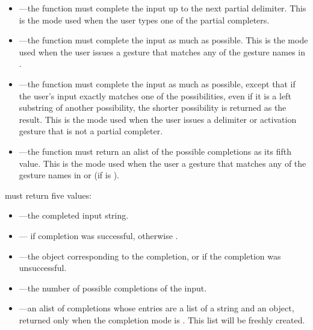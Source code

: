 \begin{itemize}
\item {}---the function must complete the input up to the
next partial delimiter.  This is the mode used when the user types one of the
partial completers.

\item {}---the function must complete the input as much as
possible.  This is the mode used when the user issues a gesture that matches any
of the gesture names in .

\item {}---the function must complete the input as much as possible,
except that if the user's input exactly matches one of the possibilities, even
if it is a left substring of another possibility, the shorter possibility is
returned as the result.  This is the mode used when the user issues a delimiter
or activation gesture that is not a partial completer.

\item {}---the function must return an alist of the possible
completions as its fifth value.  This is the mode used when the user a gesture
that matches any of the gesture names in  or
 (if  is ).
\end{itemize}

 must return five values:

\begin{itemize}
\item {}---the completed input string.

\item {}--- if completion was successful, otherwise
.

\item {}---the object corresponding to the completion, or  if
the completion was unsuccessful.

\item {}---the number of possible completions of the input.

\item {}---an alist of completions whose entries are a list
of a string and an object, returned only when the completion mode is
.  This list will be freshly created.
\end{itemize}

